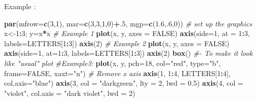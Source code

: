 \documentclass[]{book}
\newenvironment{Shaded}{\begin{snugshade}}{\end{snugshade}}
\newcommand{\KeywordTok}[1]{\textcolor[rgb]{0.13,0.29,0.53}{\textbf{#1}}}
\newcommand{\DataTypeTok}[1]{\textcolor[rgb]{0.13,0.29,0.53}{#1}}
\newcommand{\DecValTok}[1]{\textcolor[rgb]{0.00,0.00,0.81}{#1}}
\newcommand{\FloatTok}[1]{\textcolor[rgb]{0.00,0.00,0.81}{#1}}
\newcommand{\StringTok}[1]{\textcolor[rgb]{0.31,0.60,0.02}{#1}}
\newcommand{\CommentTok}[1]{\textcolor[rgb]{0.56,0.35,0.01}{\textit{#1}}}
\newcommand{\OtherTok}[1]{\textcolor[rgb]{0.56,0.35,0.01}{#1}}
\newcommand{\OperatorTok}[1]{\textcolor[rgb]{0.81,0.36,0.00}{\textbf{#1}}}
\newcommand{\NormalTok}[1]{#1}
\begin{document}
Example :

\begin{Shaded}
\begin{Highlighting}[]
\KeywordTok{par}\NormalTok{(}\DataTypeTok{mfrow=}\KeywordTok{c}\NormalTok{(}\DecValTok{3}\NormalTok{,}\DecValTok{1}\NormalTok{), }\DataTypeTok{mar=}\KeywordTok{c}\NormalTok{(}\DecValTok{3}\NormalTok{,}\DecValTok{3}\NormalTok{,}\DecValTok{1}\NormalTok{,}\DecValTok{0}\NormalTok{)}\OperatorTok{+}\NormalTok{.}\DecValTok{5}\NormalTok{, }\DataTypeTok{mgp=}\KeywordTok{c}\NormalTok{(}\FloatTok{1.6}\NormalTok{,.}\DecValTok{6}\NormalTok{,}\DecValTok{0}\NormalTok{))  }\CommentTok{# set up the graphics}
\NormalTok{x<-}\DecValTok{1}\OperatorTok{:}\DecValTok{3}\NormalTok{; y=x}\OperatorTok{*}\NormalTok{x}
\CommentTok{# Example 1}
\KeywordTok{plot}\NormalTok{(x, y, }\DataTypeTok{axes =} \OtherTok{FALSE}\NormalTok{)}
\KeywordTok{axis}\NormalTok{(}\DataTypeTok{side=}\DecValTok{1}\NormalTok{, }\DataTypeTok{at =} \DecValTok{1}\OperatorTok{:}\DecValTok{3}\NormalTok{, }\DataTypeTok{labels=}\NormalTok{LETTERS[}\DecValTok{1}\OperatorTok{:}\DecValTok{3}\NormalTok{])}
\KeywordTok{axis}\NormalTok{(}\DecValTok{2}\NormalTok{)}
\CommentTok{# Example 2}
\KeywordTok{plot}\NormalTok{(x, y, }\DataTypeTok{axes =} \OtherTok{FALSE}\NormalTok{)}
\KeywordTok{axis}\NormalTok{(}\DataTypeTok{side=}\DecValTok{1}\NormalTok{, }\DataTypeTok{at=}\DecValTok{1}\OperatorTok{:}\DecValTok{3}\NormalTok{, }\DataTypeTok{labels=}\NormalTok{LETTERS[}\DecValTok{1}\OperatorTok{:}\DecValTok{3}\NormalTok{])}
\KeywordTok{axis}\NormalTok{(}\DecValTok{2}\NormalTok{)}
\KeywordTok{box}\NormalTok{() }\CommentTok{#- To make it look like "usual" plot}
\CommentTok{#Example3:}
\KeywordTok{plot}\NormalTok{(x, y, }\DataTypeTok{pch=}\DecValTok{18}\NormalTok{, }\DataTypeTok{col=}\StringTok{"red"}\NormalTok{, }\DataTypeTok{type=}\StringTok{"b"}\NormalTok{,}
     \DataTypeTok{frame=}\OtherTok{FALSE}\NormalTok{, }\DataTypeTok{xaxt=}\StringTok{"n"}\NormalTok{) }\CommentTok{# Remove x axis}
\KeywordTok{axis}\NormalTok{(}\DecValTok{1}\NormalTok{, }\DecValTok{1}\OperatorTok{:}\DecValTok{4}\NormalTok{, LETTERS[}\DecValTok{1}\OperatorTok{:}\DecValTok{4}\NormalTok{], }\DataTypeTok{col.axis=}\StringTok{"blue"}\NormalTok{)}
\KeywordTok{axis}\NormalTok{(}\DecValTok{3}\NormalTok{, }\DataTypeTok{col =} \StringTok{"darkgreen"}\NormalTok{, }\DataTypeTok{lty =} \DecValTok{2}\NormalTok{, }\DataTypeTok{lwd =} \FloatTok{0.5}\NormalTok{)}
\KeywordTok{axis}\NormalTok{(}\DecValTok{4}\NormalTok{, }\DataTypeTok{col =} \StringTok{"violet"}\NormalTok{, }\DataTypeTok{col.axis =} \StringTok{"dark violet"}\NormalTok{, }\DataTypeTok{lwd =} \DecValTok{2}\NormalTok{)}
\end{Highlighting}
\end{Shaded}
\end{document}
